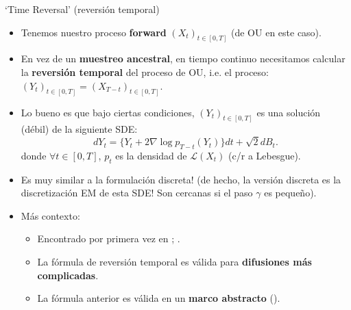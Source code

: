 \documentclass[aspectratio=169,xcolor=dvipsnames, t, spanish]{beamer}
\begin{document}
    \begin{frame}{`Time Reversal' (reversión temporal)}
        \begin{itemize}
        \item Tenemos nuestro proceso \textbf{forward} $(X_{t})_{t\in[0,T]}$ (de OU en este caso).
            \item En vez de un \textbf{muestreo ancestral}, en tiempo continuo necesitamos calcular la \textbf{reversión temporal} del proceso de OU, i.e. el proceso: $(Y_{t})_{t\in[0,T]}=(X_{T-t})_{t\in[0,T]}$.
            \pause
            \item Lo bueno es que bajo ciertas condiciones, $(Y_{t})_{t\in[0,T]}$ es una solución (débil) de la siguiente SDE:\vspace{-2mm}
            \[ dY_{t}=\{Y_{t}+2\nabla \log p_{T-t}(Y_{t})\}dt+\sqrt{2}dB_{t} . \]
            donde $\forall t\in[0,T]$, $p_{t}$ es la densidad de $\mathcal{L}(X_{t})$ (c/r a Lebesgue).
            \pause
            \item Es muy similar a la formulación discreta! (de hecho, la versión discreta es la discretización EM de esta SDE! Son cercanas si el paso $\gamma$ es pequeño).
            \item Más contexto:
            \begin{itemize}
                \item Encontrado por primera vez en \cite{Anderson1982}; \cite{HaussmannPardoux1986}.
                \item La fórmula de reversión temporal es válida para \textbf{difusiones más complicadas}.
                \item La fórmula anterior es válida en un \textbf{marco abstracto} (\cite{Cattiaux2021}).
            \end{itemize}
        \end{itemize}
    \end{frame}
    
\end{document}

